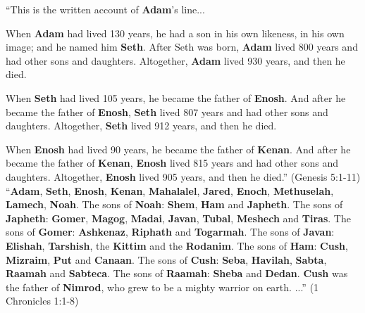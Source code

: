 \documentclass[11pt]{article}
\begin{document}
``This is the written account of {\bf Adam}'s line...


When {\bf Adam} had lived 130 years, he had a son in his own likeness, in his own image; and he named him {\bf Seth}. 
After Seth was born, {\bf Adam} lived 800 years and had other sons and daughters. 
Altogether, {\bf Adam} lived 930 years, and then he died.

When {\bf Seth} had lived 105 years, he became the father of {\bf Enosh}. 
And after he became the father of {\bf Enosh}, {\bf Seth} lived 807 years and had other sons and daughters. 
Altogether, {\bf Seth} lived 912 years, and then he died.

When {\bf Enosh} had lived 90 years, he became the father of {\bf Kenan}. 
And after he became the father of {\bf Kenan}, {\bf Enosh} lived 815 years and had other sons and daughters. 
Altogether, {\bf Enosh} lived 905 years, and then he died.'' (Genesis 5:1-11) \\


``{\bf Adam}, {\bf Seth}, {\bf Enosh}, {\bf Kenan}, {\bf Mahalalel}, {\bf Jared}, {\bf Enoch}, 
{\bf Methuselah}, {\bf Lamech}, {\bf Noah}. 
The sons of {\bf Noah}: {\bf Shem}, {\bf Ham} and {\bf Japheth}.
The sons of {\bf Japheth}: {\bf Gomer}, {\bf Magog}, {\bf Madai}, {\bf Javan}, {\bf Tubal}, {\bf Meshech} and {\bf Tiras}.
The sons of {\bf Gomer}: {\bf Ashkenaz}, {\bf Riphath} and {\bf Togarmah}.
The sons of {\bf Javan}: {\bf Elishah}, {\bf Tarshish}, the {\bf Kittim} and the {\bf Rodanim}.
The sons of {\bf Ham}: {\bf Cush}, {\bf Mizraim}, {\bf Put} and {\bf Canaan}.
The sons of {\bf Cush}: {\bf Seba}, {\bf Havilah}, {\bf Sabta}, {\bf Raamah} and {\bf Sabteca}.
The sons of {\bf Raamah}: {\bf Sheba} and {\bf Dedan}. 
{\bf Cush} was the father of {\bf Nimrod}, who grew to be a mighty warrior on earth. ...'' (1 Chronicles 1:1-8) \\
\end{document}
